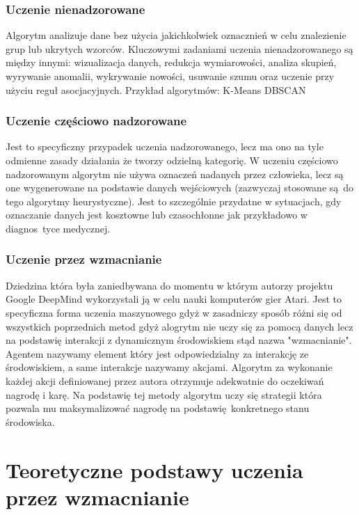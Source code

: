 \documentclass[a4paper, 10pt]{article}
\begin{document}
    \subsubsection{Uczenie nienadzorowane}
    Algorytm analizuje dane bez użycia jakichkolwiek oznacznień w celu znalezienie grup lub ukrytych wzorców.
    Kluczowymi zadaniami uczenia nienadzorowanego są między innymi: wizualizacja danych,
    redukcja wymiarowości, analiza skupień, wyrywanie anomalii, wykrywanie nowości, usuwanie szumu
    oraz uczenie przy użyciu reguł asocjacyjnych. Przykład algorytmów: K-Means DBSCAN

    \subsubsection{Uczenie częściowo nadzorowane}
    Jest to specyficzny przypadek uczenia nadzorowanego, lecz ma ono na tyle odmienne zasady działania że tworzy
    odzielną kategorię. W uczeniu częściowo nadzorowanym algorytm nie używa oznaczeń nadanych przez człowieka, lecz są one 
    wygenerowane na podstawie danych wejściowych (zazwyczaj stosowane są do tego algorytmy heurystyczne).
    Jest to szczególnie przydatne w sytuacjach, gdy oznaczanie danych jest kosztowne lub czasochłonne jak przykładowo
    w diagnos~tyce medycznej. 

    \subsubsection{Uczenie przez wzmacnianie}
    Dziedzina która była zaniedbywana do momentu w którym autorzy projektu Google DeepMind wykorzystali ją w celu nauki komputerów 
    gier Atari. Jest to specyficzna forma uczenia maszynowego gdyż w zasadniczy sposób różni się od wszystkich poprzednich metod gdyż
    alogrytm nie uczy się za pomocą danych lecz na podstawię interakcji z dynamicznym środowiskiem stąd nazwa "wzmacnianie". 
    Agentem nazywamy element który jest odpowiedzialny za interakcję ze środowiskiem, a same interakcje nazywamy akcjami.
    Algorytm za wykonanie każdej akcji definiowanej przez autora otrzymuje adekwatnie do oczekiwań nagrodę i karę. Na podstawię 
    tej metody algorytm uczy się strategii która pozwala mu maksymalizować nagrodę na podstawię konkretnego stanu środowiska.
    
    \section{Teoretyczne podstawy uczenia przez wzmacnianie}
\end{document}
